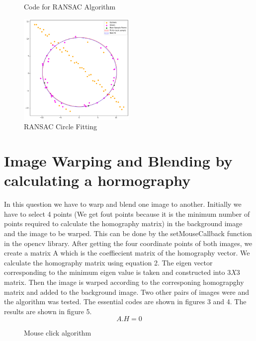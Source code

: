 \documentclass[11pt]{article}
\begin{document}
\begin{flushleft}
\begin{figure}[htp]
    \caption{Code for RANSAC Algorithm}
\end{figure}
\vspace{-0.5cm}
\begin{figure}[htp]
    \centering
    \includegraphics[width=0.5\textwidth]{Question1output.png}
    \caption{RANSAC Circle Fitting}
\end{figure}
\section{Image Warping and Blending by calculating a hormography}
In this question we have to warp and blend one image to another. Initially we have to select 4 points (We get fout points because it is the minimum number of points required to calculate the homography matrix) in the background image and the image to be warped. This can be done by the setMouseCallback function in the opencv library. After getting the four coordinate points of both images, we create a matrix A which is the coeffiecient matrix of the homography vector. We calculate the homography matrix using equation 2. The eigen vector corresponding to the minimum eigen value is taken and constructed into $3X3$ matrix. Then the image is warped according to the corresponing homograpghy matrix and added to the background image.
Two other pairs of images were and the algorithm was tested. The essential codes are shown in figures 3 and 4. The results are shown in figure 5.
\begin{equation}\label{Equation 2: hormography equation}
     A.H = 0
\end{equation}
\begin{figure}
    \centering
    \qquad
    \caption{Mouse click algorithm}
    \label{fig:example}
\end{figure}


\end{flushleft}
\end{document}
